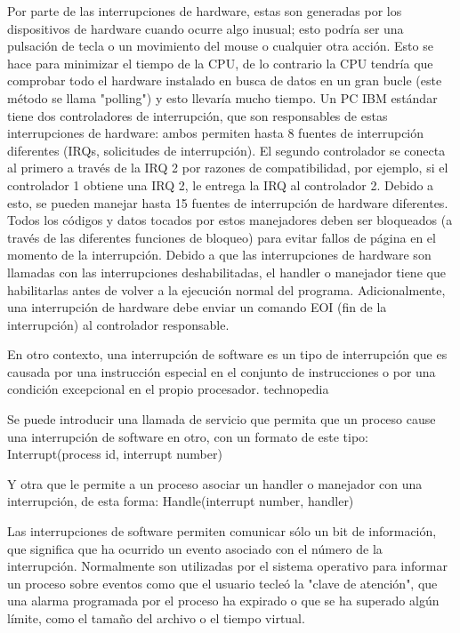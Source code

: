 \documentclass[12pt]{article}
\begin{document}
{Por parte de las interrupciones de hardware, estas son generadas por los dispositivos de hardware cuando ocurre algo inusual; esto podría ser una pulsación de tecla o un movimiento del mouse o cualquier otra acción. Esto se hace para minimizar el tiempo de la CPU, de lo contrario la CPU tendría que comprobar todo el hardware instalado en busca de datos en un gran bucle (este método se llama "polling") y esto llevaría mucho tiempo. Un PC IBM estándar tiene dos controladores de interrupción, que son responsables de estas interrupciones de hardware: ambos permiten hasta 8 fuentes de interrupción diferentes (IRQs, solicitudes de interrupción). El segundo controlador se conecta al primero a través de la IRQ 2 por razones de compatibilidad, por ejemplo, si el controlador 1 obtiene una IRQ 2, le entrega la IRQ al controlador 2. Debido a esto, se pueden manejar hasta 15 fuentes de interrupción de hardware diferentes. Todos los códigos y datos tocados por estos manejadores deben ser bloqueados (a través de las diferentes funciones de bloqueo) para evitar fallos de página en el momento de la interrupción. Debido a que las interrupciones de hardware son llamadas con las interrupciones deshabilitadas, el handler o manejador tiene que habilitarlas antes de volver a la ejecución normal del programa. Adicionalmente, una interrupción de hardware debe enviar un comando EOI (fin de la interrupción) al controlador responsable.
\citep{LambdaEcu}
\newline

En otro contexto, una interrupción de software es un tipo de interrupción que es causada por una instrucción especial en el conjunto de instrucciones o por una condición excepcional en el propio procesador. technopedia \citep{LambdaEcu}

Se puede introducir una llamada de servicio que permita que un proceso cause una interrupción de software en otro, con un formato de este tipo:
Interrupt(process id, interrupt number)

Y otra que le permite a un proceso asociar un handler o manejador con una interrupción, de esta forma:
Handle(interrupt number, handler)

Las interrupciones de software permiten comunicar sólo un bit de información, que significa que ha ocurrido un evento asociado con el número de la interrupción. Normalmente son utilizadas por el sistema operativo para informar un proceso sobre eventos como que el usuario tecleó la "clave de atención", que una alarma programada por el proceso ha expirado o que se ha superado algún límite, como el tamaño del archivo o el tiempo virtual.

}
\end{document}
